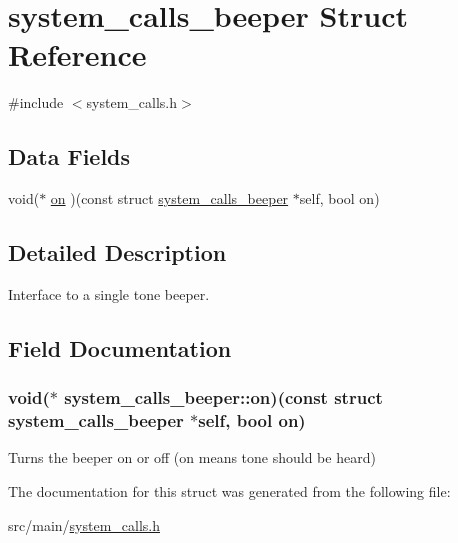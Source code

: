 \hypertarget{structsystem__calls__beeper}{\section{system\+\_\+calls\+\_\+beeper Struct Reference}
\label{structsystem__calls__beeper}
}


{\ttfamily \#include $<$system\+\_\+calls.\+h$>$}

\subsection*{Data Fields}
\begin{DoxyCompactItemize}
\item 
void($\ast$ \hyperlink{structsystem__calls__beeper_a63d6d8b5043d4e7ada49033d50cf9674}{on} )(const struct \hyperlink{structsystem__calls__beeper}{system\+\_\+calls\+\_\+beeper} $\ast$self, bool on)
\end{DoxyCompactItemize}


\subsection{Detailed Description}
Interface to a single tone beeper. 

\subsection{Field Documentation}
\hypertarget{structsystem__calls__beeper_a63d6d8b5043d4e7ada49033d50cf9674}{
\subsubsection[{on}]{\setlength{\rightskip}{0pt plus 5cm}void($\ast$ system\+\_\+calls\+\_\+beeper\+::on)(const struct {\bf system\+\_\+calls\+\_\+beeper} $\ast$self, bool on)}}\label{structsystem__calls__beeper_a63d6d8b5043d4e7ada49033d50cf9674}
Turns the beeper on or off (on means tone should be heard) 

The documentation for this struct was generated from the following file\+:\begin{DoxyCompactItemize}
\item 
src/main/\hyperlink{system__calls_8h}{system\+\_\+calls.\+h}\end{DoxyCompactItemize}

